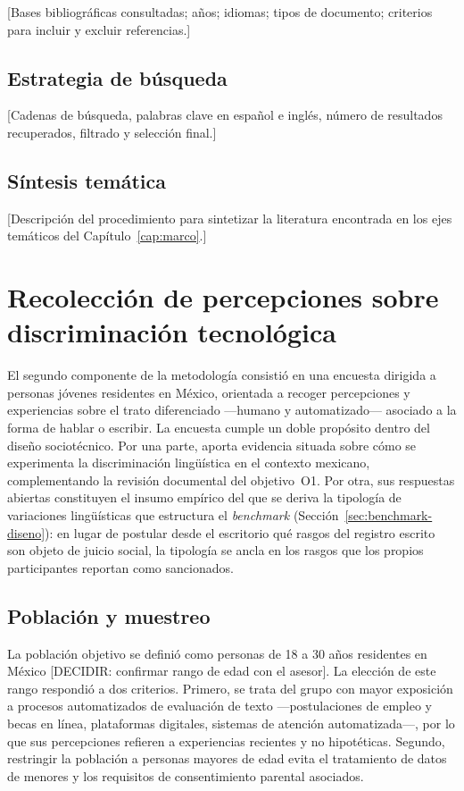 [Bases bibliográficas consultadas; años; idiomas; tipos de documento;
criterios para incluir y excluir referencias.]

\subsection{Estrategia de búsqueda}

[Cadenas de búsqueda, palabras clave en español e inglés, número de resultados
recuperados, filtrado y selección final.]

\subsection{Síntesis temática}

[Descripción del procedimiento para sintetizar la literatura encontrada en
los ejes temáticos del Capítulo~\ref{cap:marco}.]

\section{Recolección de percepciones sobre discriminación tecnológica}
\label{sec:encuesta}

El segundo componente de la metodología consistió en una encuesta dirigida a
personas jóvenes residentes en México, orientada a recoger percepciones y
experiencias sobre el trato diferenciado ---humano y automatizado--- asociado
a la forma de hablar o escribir. La encuesta cumple un doble propósito dentro
del diseño sociotécnico. Por una parte, aporta evidencia situada sobre cómo se
experimenta la discriminación lingüística en el contexto mexicano,
complementando la revisión documental del objetivo~O1. Por otra, sus
respuestas abiertas constituyen el insumo empírico del que se deriva la
tipología de variaciones lingüísticas que estructura el \emph{benchmark}
(Sección~\ref{sec:benchmark-diseno}): en lugar de postular desde el escritorio
qué rasgos del registro escrito son objeto de juicio social, la tipología se
ancla en los rasgos que los propios participantes reportan como sancionados.

\subsection{Población y muestreo}
\label{sec:poblacion-muestreo}

La población objetivo se definió como personas de 18 a 30 años residentes en
México [DECIDIR: confirmar rango de edad con el asesor]. La elección de este
rango respondió a dos criterios. Primero, se trata del grupo con mayor
exposición a procesos automatizados de evaluación de texto ---postulaciones de
empleo y becas en línea, plataformas digitales, sistemas de atención
automatizada---, por lo que sus percepciones refieren a experiencias recientes
y no hipotéticas. Segundo, restringir la población a personas mayores de edad
evita el tratamiento de datos de menores y los requisitos de consentimiento
parental asociados.

